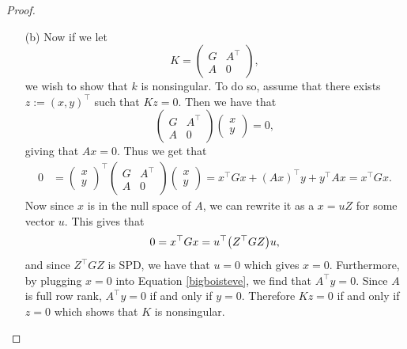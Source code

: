 \documentclass[12pt]{report}
\begin{document}
\begin{problem}
\begin{proof}
\begin{enumerate}
    \item [(b)]
    Now if we let
    \begin{equation*}
        K = \begin{pmatrix}
            G & A^\top\\ A & 0
        \end{pmatrix},
    \end{equation*}
    we wish to show that $k$ is nonsingular. To do so, assume that there exists $z := (x,y)^\top$ such that $Kz = 0$. Then we have that
    \begin{equation}\label{bigboisteve}
        \begin{pmatrix}
            G & A^\top\\ A & 0
        \end{pmatrix}\begin{pmatrix}
            x\\y
        \end{pmatrix} = 0,
    \end{equation}
    giving that $Ax = 0$. Thus we get that
    \begin{align*}
        0 &= \begin{pmatrix}
            x \\ y
        \end{pmatrix}^\top \begin{pmatrix}
            G & A^\top\\ A & 0
        \end{pmatrix} \begin{pmatrix}
            x \\ y
        \end{pmatrix} = x^\top G x + (Ax)^\top y + y^\top Ax = x^\top G x.
    \end{align*}
    Now since $x$ is in the null space of $A$, we can rewrite it as a $x = u Z$ for some vector $u$. This gives that 
    \begin{equation*}
        0 = x^\top G x = u^\top  {\left(Z^\top G Z\right)} u, 
    \end{equation*}
    and since $Z^\top G Z$ is SPD, we have that $u = 0$ which gives $x = 0$. Furthermore, by plugging $x = 0$ into Equation \ref{bigboisteve}, we find that $A^\top y = 0$. Since $A$ is full row rank, $A^\top y = 0$ if and only if $y = 0$. Therefore $Kz = 0$ if and only if $z = 0$ which shows that $K$ is nonsingular.


\end{enumerate}
\end{proof}
\end{problem}
\end{document}
